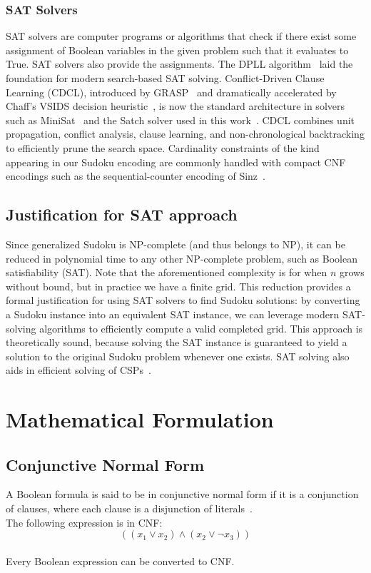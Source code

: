 \documentclass[12pt]{article}
\begin{document}
\subsubsection{SAT Solvers}
SAT solvers are computer programs or algorithms that check if there exist some assignment of Boolean variables in the given problem such that it evaluates to True. SAT solvers also provide the assignments. The DPLL algorithm~\citep{DPLL1962} laid the foundation for modern search-based SAT solving. Conflict-Driven Clause Learning (CDCL), introduced by GRASP~\citep{GRASP1996} and dramatically accelerated by Chaff's VSIDS decision heuristic~\citep{Chaff2001}, is now the standard architecture in solvers such as MiniSat~\citep{MiniSat2003} and the Satch solver used in this work~\citep{Satch}. CDCL combines unit propagation, conflict analysis, clause learning, and non-chronological backtracking to efficiently prune the search space. Cardinality constraints of the kind appearing in our Sudoku encoding are commonly handled with compact CNF encodings such as the sequential-counter encoding of Sinz~\citep{Sinz2005}.



\subsection{Justification for SAT approach}

Since generalized Sudoku is NP-complete (and thus belongs to NP), it can be reduced in polynomial time to any other NP-complete problem, such as Boolean satisfiability (SAT).
Note that the aforementioned complexity is for when $n$ grows without bound, but in practice we have a finite grid. 
This reduction provides a formal justification for using SAT solvers to find Sudoku solutions: by converting a Sudoku instance into an equivalent SAT instance, we can leverage modern SAT-solving algorithms to efficiently compute a valid completed grid. This approach is theoretically sound, because solving the SAT instance is guaranteed to yield a solution to the original Sudoku problem whenever one exists.
SAT solving also aids in efficient solving of CSPs~\citep{LARDEUX2020113243}.


\section{Mathematical Formulation}
\subsection{Conjunctive Normal Form}
A Boolean formula is said to be in conjunctive normal form if it is a conjunction of clauses, where each clause is a disjunction of literals~\citep{HuthRyan2004}.\\ 
The following expression is in CNF: $$( (x_1 \vee x_2) \wedge (x_2 \vee \neg x_3)  )$$\\ 
Every Boolean expression can be converted to CNF.
\end{document}
